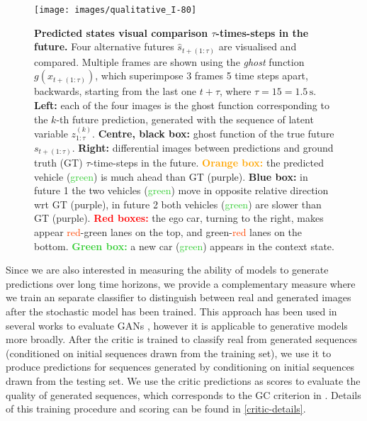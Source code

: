 \documentclass{article}
\begin{document}
\begin{figure}[t!]
  \centering
  \texttt{[image: images/qualitative\_I-80]}
  \caption{
    \textbf{Predicted states visual comparison $\tau$-times-steps in the future.}
    Four alternative futures $\hat{s}_{t+(1:\tau)}$ are visualised and compared.
    Multiple frames are shown using the \emph{ghost} function $g(x_{t+(1:\tau)})$, which superimpose 3 frames 5 time steps apart, backwards, starting from the last one $t + \tau$, where $\tau = 15 = 1.5\,\text{s}$.
    \textbf{Left:} each of the four images is the ghost function corresponding to the $k$-th future prediction, generated with the sequence of latent variable $z_{1:\tau}^{(k)}$.
    \textbf{Centre, black box:} ghost function of the true future $s_{t+(1:\tau)}$.
    \textbf{Right:} differential images between predictions  and ground truth (GT) $\tau$-time-steps in the future.
    \textcolor{Orange}{\textbf{Orange box:}} the predicted vehicle (\textcolor{LimeGreen}{green}) is much ahead than GT (\textcolor{Mulberry}{purple}).
    \textcolor{ProcessBlue}{\textbf{Blue box:}} in future 1 the two vehicles (\textcolor{LimeGreen}{green}) move in opposite relative direction wrt GT (\textcolor{Mulberry}{purple}), in future 2 both vehicles (\textcolor{LimeGreen}{green}) are slower than GT (\textcolor{Mulberry}{purple}).
    \textcolor{Red}{\textbf{Red boxes:}} the ego car, turning to the right, makes appear \textcolor{OrangeRed}{red}-\textcolor{PineGreen}{green} lanes on the top, and \textcolor{PineGreen}{green}-\textcolor{OrangeRed}{red} lanes on the bottom.
    \textcolor{LimeGreen}{\textbf{Green box:}} a new car (\textcolor{LimeGreen}{green}) appears in the context state.
    }
    \label{I-80_qual}
\end{figure}

Since we are also interested in measuring the ability of models to generate predictions over long time horizons, we provide a complementary measure where we train an separate classifier to distinguish between real and generated images after the stochastic model has been trained.
This approach has been used in several works to evaluate GANs \citep{Danihelka17, Rosca17, GANeval}, however it is applicable to generative models more broadly.
After the critic is trained to classify real from generated sequences (conditioned on initial sequences drawn from the training set), we use it to produce predictions for sequences generated by conditioning on initial sequences drawn from the testing set.
We use the critic predictions as scores to evaluate the quality of generated sequences, which corresponds to the GC criterion in \citep{GANeval}.
Details of this training procedure and scoring can be found in \cref{critic-details}.
\end{document}
